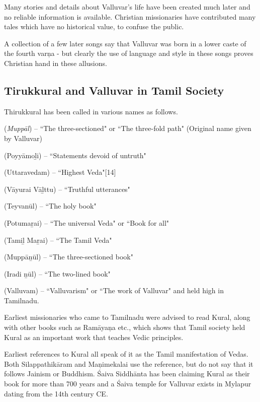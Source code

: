 Many stories and details about Valluvar’s life have been created much later and no reliable information is available. Christian missionaries have contributed many tales which have no historical value, to confuse the public.

A collection of a few later songs say that Valluvar was born in a lower caste of the fourth varņa - but clearly the use of language and style in these songs proves Christian hand in these allusions.

\subsection*{Tirukkural and Valluvar in Tamil Society}

Thirukkural has been called in various names as follows.

 (\textit{Muppāl}) – “The three-sectioned" or “The three-fold path" (Original name given by Valluvar)

 (Poyyāmoḻi) – “Statements devoid of untruth"

 (Uttaravedam) – “Highest Veda"[14]

 (Vāyurai Vāḻttu) – “Truthful utterances"

 (Teyvanūl) – “The holy book"

 (Potumaṟai) – “The universal Veda" or “Book for all"

 (Tamiḻ Maṟai) – “The Tamil Veda"

 (Muppāṉūl) – “The three-sectioned book"

 (Iradi ṉūl) – “The two-lined book"

 (Valluvam) – “Valluvarism" or “The work of Valluvar" and held high in Tamilnadu.

Earliest missionaries who came to Tamilnadu were advised to read Kural, along with other books such as Ramāyaņa etc., which shows that Tamil society held Kural as an important work that teaches Vedic principles.

Earliest references to Kural all speak of it as the Tamil manifestation of Vedas. Both Silappathikāram and Maņimekalai use the reference, but do not say that it follows Jainism or Buddhism. Śaiva Siddhānta has been claiming Kural as their book for more than 700 years and a Śaiva temple for Valluvar exists in Mylapur dating from the 14th century CE.

